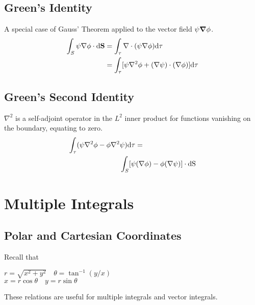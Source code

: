 \subsection*{Green's Identity}
A special case of Gauss' Theorem applied to the vector field $\psi \grad \phi$.
\begin{equation*}
    \begin{aligned}
        \int_{S} \psi \nabla \phi \cdot \differential \mathbf{S} &= \int_{\tau} \nabla \cdot (\psi \nabla \phi) \differential \tau \\
        &= \int_{\tau} [\psi \nabla^2 \phi + (\nabla \psi) \cdot (\nabla \phi)] \differential \tau
    \end{aligned}
\end{equation*}
\subsection*{Green's Second Identity}
$\nabla^2$ is a self-adjoint operator in the $L^2$ inner product for functions vanishing on the boundary, equating to zero.
\begin{equation*}
    \begin{aligned}
    \int_{\tau}(\psi \nabla^2 \phi - \phi \nabla^2 &\psi) \differential \tau = \\
    &\int_{S} [\psi(\nabla \phi) - \phi(\nabla \psi)] \cdot \differential \mathrm{S}
    \end{aligned}
\end{equation*}

\section{Multiple Integrals}
\subsection*{Polar and Cartesian Coordinates}
Recall that
\vspace{\baselineskip}

$r = \sqrt{x^2 + y^2} \quad \theta = \tan^{-1} (y/x)$ \\
$x = r \cos \theta \quad y = r \sin \theta$ 
\vspace{\baselineskip}

These relations are useful for multiple integrals and vector integrals.